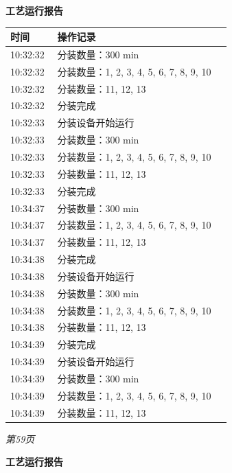 \documentclass[UTF8,10pt,a4paper,fontset=fandol]{ctexart}
\begin{document}
\medskip

\begin{center}
\begin{minipage}[t]{0.46\linewidth}
\centering
\textbf{工艺运行报告}

\scriptsize
\begin{tabular}{|p{0.20\linewidth}|p{0.74\linewidth}|}
\hline
时间 & 操作记录\\
\hline
10:32:32 & 分装数量：300 min\\
10:32:32 & 分装数量：1, 2, 3, 4, 5, 6, 7, 8, 9, 10\\
10:32:32 & 分装数量：11, 12, 13\\
10:32:32 & 分装完成\\
10:32:33 & 分装设备开始运行\\
10:32:33 & 分装数量：300 min\\
10:32:33 & 分装数量：1, 2, 3, 4, 5, 6, 7, 8, 9, 10\\
10:32:33 & 分装数量：11, 12, 13\\
10:32:33 & 分装完成\\
10:34:37 & 分装数量：300 min\\
10:34:37 & 分装数量：1, 2, 3, 4, 5, 6, 7, 8, 9, 10\\
10:34:37 & 分装数量：11, 12, 13\\
10:34:38 & 分装完成\\
10:34:38 & 分装设备开始运行\\
10:34:38 & 分装数量：300 min\\
10:34:38 & 分装数量：1, 2, 3, 4, 5, 6, 7, 8, 9, 10\\
10:34:38 & 分装数量：11, 12, 13\\
10:34:39 & 分装完成\\
10:34:39 & 分装设备开始运行\\
10:34:39 & 分装数量：300 min\\
10:34:39 & 分装数量：1, 2, 3, 4, 5, 6, 7, 8, 9, 10\\
10:34:39 & 分装数量：11, 12, 13\\
\hline
\end{tabular}

\vfill
\textit{第59页}
\end{minipage}
\hfill
\begin{minipage}[t]{0.46\linewidth}
\centering
\textbf{工艺运行报告}


\end{minipage}
\end{center}
\end{document}
